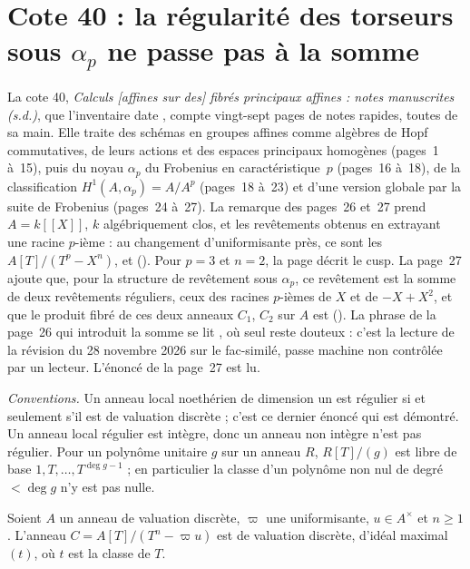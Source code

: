 \section[Cote 40 : la régularité des torseurs sous α\_p ne passe pas à la somme]{Cote 40 : la régularité des torseurs sous $\alpha_p$ ne passe pas à la somme\protect{}}\label{sec:40}

La cote 40, \emph{Calculs [affines sur des] fibrés principaux affines : notes manuscrites (s.d.)}, que l'inventaire date \q{[années 1960-1970]}, compte vingt-sept pages de notes rapides, toutes de sa main. Elle traite des schémas en groupes affines comme algèbres de Hopf commutatives, de leurs actions et des espaces principaux homogènes (pages~1 à~15), puis du noyau $\alpha_p$ du Frobenius en caractéristique~$p$ (pages~16 à~18), de la classification $H^1(A, \alpha_p) = A/A^p$ (pages~18 à~23) et d'une version globale par la suite de Frobenius (pages~24 à~27). La remarque des pages~26 et~27 prend $A = k[[X]]$, $k$ algébriquement clos, et les revêtements obtenus en extrayant une racine $p$-ième : au changement d'uniformisante près, ce sont les $A[T]/(T^p - X^n)$, et  (). Pour $p = 3$ et $n = 2$, la page décrit le cusp. La page~27 ajoute que, pour la structure de revêtement sous $\alpha_p$, ce revêtement est la somme de deux revêtements réguliers, ceux des racines $p$-ièmes de $X$ et de $-X + X^2$, et que le produit fibré de ces deux anneaux $C_1$, $C_2$ sur $A$ est  (). La phrase de la page~26 qui introduit la somme se lit , où seul  reste douteux : c'est la lecture de la révision du 28 novembre 2026 sur le fac-similé, passe machine non contrôlée par un lecteur. L'énoncé de la page~27 est lu.

\noindent\emph{Conventions.} Un anneau local noethérien de dimension un est régulier si et seulement s'il est de valuation discrète ; c'est ce dernier énoncé qui est démontré. Un anneau local régulier est intègre, donc un anneau non intègre n'est pas régulier. Pour un polynôme unitaire $g$ sur un anneau $R$, $R[T]/(g)$ est libre de base $1, T, \ldots, T^{\deg g - 1}$ ; en particulier la classe d'un polynôme non nul de degré $< \deg g$ n'y est pas nulle.

\begin{lemme}\label{lem:40-dvr}
Soient $A$ un anneau de valuation discrète, $\varpi$ une uniformisante, $u \in A^\times$ et $n \geq 1$. L'anneau $C = A[T]/(T^n - \varpi u)$ est de valuation discrète, d'idéal maximal $(t)$, où $t$ est la classe de $T$.
\end{lemme}

